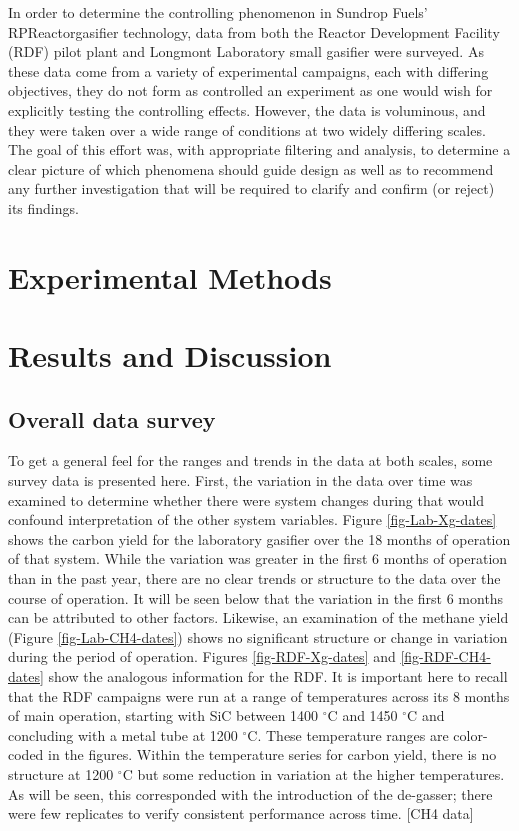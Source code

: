\documentclass[11pt,twocolumn]{article}
\begin{document}
In order to determine the controlling phenomenon in Sundrop Fuels' RPReactor\texttrademark gasifier technology, data from both the Reactor Development Facility (RDF) pilot plant and Longmont Laboratory small gasifier were surveyed.  As these data come from a variety of experimental campaigns, each with differing objectives, they do not form as controlled an experiment as one would wish for explicitly testing the controlling effects.  However, the data is voluminous, and they were taken over a wide range of conditions at two widely differing scales.  The goal of this effort was, with appropriate filtering and analysis, to determine a clear picture of which phenomena should guide design as well as to recommend any further investigation that will be required to clarify and confirm (or reject) its findings.

\section*{Experimental Methods}



\section*{Results and Discussion}

\subsection*{Overall data survey}
To get a general feel for the ranges and trends in the data at both scales, some survey data is presented here.  First, the variation in the data over time was examined to determine whether there were system changes during that would confound interpretation of the other system variables.  Figure \ref{fig-Lab-Xg-dates} shows the carbon yield for the laboratory gasifier over the 18 months of operation of that system.  While the variation was greater in the first 6 months of operation than in the past year, there are no clear trends or structure to the data over the course of operation.  It will be seen below that the variation in the first 6 months can be attributed to other factors.  Likewise, an examination of the methane yield (Figure \ref{fig-Lab-CH4-dates}) shows no significant structure or change in variation during the period of operation.  Figures \ref{fig-RDF-Xg-dates} and \ref{fig-RDF-CH4-dates} show the analogous information for the RDF.  It is important here to recall that the RDF campaigns were run at a range of temperatures across its 8 months of main operation, starting with SiC between 1400 $^{\circ}$C and 1450 $^{\circ}$C and concluding with a metal tube at 1200 $^{\circ}$C.  These temperature ranges are color-coded in the figures.  Within the temperature series for carbon yield, there is no structure at 1200 ${^\circ}$C but some reduction in variation at the higher temperatures.  As will be seen, this corresponded with the introduction of the de-gasser; there were few replicates to verify consistent performance across time. [CH4 data]
\end{document}
